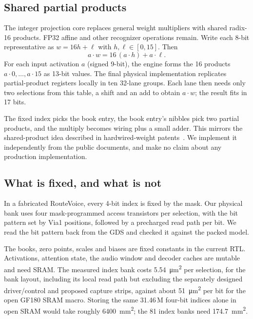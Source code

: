 \subsection{Shared partial products}
\label{sec:shared}
The integer projection core replaces general weight multipliers with shared radix-16 products. FP32 affine and other recognizer operations remain. Write each 8-bit representative as $w = 16h + \ell$ with $h,\ell\in[0,15]$. Then
\begin{equation}
a\cdot w = 16\,(a\cdot h) + a\cdot \ell .
\end{equation}
For each input activation $a$ (signed 9-bit), the engine forms the 16 products $a\cdot 0,\dots,a\cdot 15$ as 13-bit values. The final physical implementation replicates partial-product registers locally in ten 32-lane groups. Each lane then needs only two selections from this table, a shift and an add to obtain $a\cdot w$; the result fits in 17 bits.

The fixed index picks the book entry, the book entry's nibbles pick two partial products, and the multiply becomes wiring plus a small adder. This mirrors the shared-product idea described in hardwired-weight patents~\cite{taalas2026patent566,taalas2025patent802}. We implement it independently from the public documents, and make no claim about any production implementation.

\subsection{What is fixed, and what is not}
In a fabricated RouteVoice, every 4-bit index is fixed by the mask. Our physical bank uses four mask-programmed access transistors per selection, with the bit pattern set by Via1 positions, followed by a precharged read path per bit. We read the bit pattern back from the GDS and checked it against the packed model.

The books, zero points, scales and biases are fixed constants in the current RTL. Activations, attention state, the audio window and decoder caches are mutable and need SRAM. The measured index bank costs \SI{5.54}{\micro m^2} per selection, for the bank layout, including its local read path but excluding the separately designed driver/control and proposed capture strips, against about \SI{51}{\micro m^2} per bit for the open GF180 SRAM macro. Storing the same 31.46\,M four-bit indices alone in open SRAM would take roughly \SI{6400}{mm^2}; the 81 index banks need \SI{174.7}{mm^2}.
